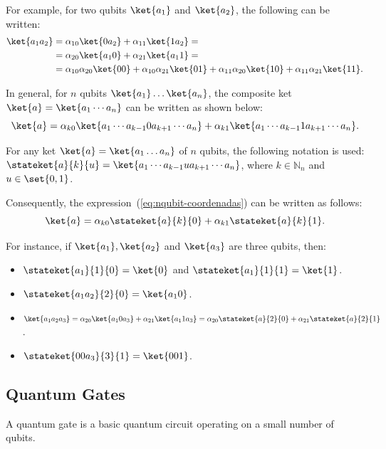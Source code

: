 For example, for two qubits $\ket{a_1}$ and $\ket{a_2}$, the following can be written:
\begin{align}
    \label{eq:2qubit-coordenadas}
    \ket{a_1a_2}&=\alpha_{10}\ket{0a_2}+\alpha_{11}\ket{1a_2}=\\
    &=\alpha_{20}\ket{a_10}+\alpha_{21}\ket{a_11}=\\
    &=\alpha_{10} \alpha_{20}\ket{00}+\alpha_{10} \alpha_{21}\ket{01}+\alpha_{11} \alpha_{20}\ket{10}+\alpha_{11} \alpha_{21}\ket{11}.
\end{align}

In general, for $n$ qubits $\ket{a_1}\dots\ket{a_n}$, the composite ket  $\ket{a}=\ket{a_1\cdots a_n}$  can be written as shown below:
\begin{equation}
    \label{eq:nqubit-coordenadas}
    \ket{a}=\alpha_{k0}\ket{a_1\cdots a_{k-1}0a_{k+1}\cdots a_n}+\alpha_{k1}\ket{a_1\cdots a_{k-1}1a_{k+1}\cdots a_n}.
\end{equation}

\begin{notation}
    For any ket $\ket{a}=\ket{a_1\dots a_n}$ of $n$ qubits, the following notation is used:
    $\stateket{a}{k}{u} = \ket{a_1\cdots a_{k-1}u a_{k+1}\cdots a_n}$, where $k \in \mathbb{N}_n$ and $u\in\set{0,1}$.
\end{notation}

Consequently, the expression~(\ref{eq:nqubit-coordenadas}) can be written as follows:
\begin{equation}
    \label{eq:canonical-state}
    \ket{a}= \alpha_{k0}\stateket{a}{k}{0}+\alpha_{k1}\stateket{a}{k}{1}.
\end{equation}

For instance, if $\ket{a_1},\ket{a_2}$ and $\ket{a_3}$ are three qubits, then:
\begin{itemize}
    \item $\stateket{a_1}{1}{0}=\ket{0}$ and $\stateket{a_1}{1}{1}=\ket{1}$.
    \item $\stateket{a_1 a_2}{2}{0}=\ket{a_1 0}$.
    \item $\ket{a_1 a_2 a_3}=\alpha_{20}\ket{a_1 0 a_3}+\alpha_{21}\ket{a_1 1 a_3}=\alpha_{20}\stateket{a}{2}{0}+\alpha_{21}\stateket{a}{2}{1}$.
    \item $\stateket{00a_3}{3}{1}=\ket{001}$.
\end{itemize}

\subsection{Quantum Gates}
A quantum gate is a basic quantum circuit operating on a small number of qubits.

